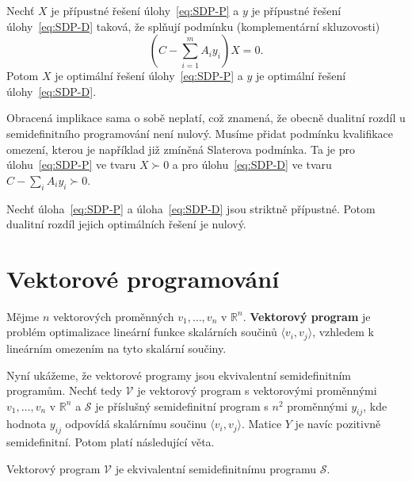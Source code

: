 \begin{vt2}
    Nechť $X$ je přípustné řešení úlohy~\ref{eq:SDP-P} a $y$ je přípustné řešení úlohy~\ref{eq:SDP-D} taková, že splňují podmínku (komplementární skluzovosti)
    $$
        \left( C - \sum_{i=1}^m A_i y_i \right) X = 0.
    $$
    Potom $X$ je optimální řešení úlohy~\ref{eq:SDP-P} a $y$ je optimální řešení úlohy~\ref{eq:SDP-D}.
\end{vt2}

Obracená implikace sama o sobě neplatí, což znamená, že obecně dualitní rozdíl u semidefinitního programování není nulový. Musíme přidat podmínku kvalifikace omezení, kterou je například již zmíněná Slaterova podmínka. Ta je pro úlohu~\ref{eq:SDP-P} ve tvaru $X \succ 0$ a pro úlohu~\ref{eq:SDP-D} ve tvaru $C - \sum_i A_i y_i \succ 0$.

\begin{vt2}
    Nechť úloha~\ref{eq:SDP-P} a úloha~\ref{eq:SDP-D} jsou striktně přípustné. Potom dualitní rozdíl jejich optimálních řešení je nulový.
\end{vt2}


\section{Vektorové programování}

Mějme $n$ vektorových proměnných $v_1, \dots, v_n$ v $\mathbb{R}^n$. \textbf{Vektorový program} je problém optimalizace lineární funkce skalárních součinů $\langle v_i, v_j \rangle$, vzhledem k lineárním omezením na tyto skalární součiny.

Nyní ukážeme, že vektorové programy jsou ekvivalentní semidefinitním programům. Nechť tedy $\mathcal{V}$ je vektorový program s vektorovými proměnnými $v_1, \dots, v_n$ v $\mathbb{R}^n$ a $\mathcal{S}$ je příslušný semidefinitní program s $n^2$ proměnnými $y_{ij}$, kde hodnota $y_{ij}$ odpovídá skalárnímu součinu $\langle v_i, v_j \rangle$. Matice $Y$ je navíc pozitivně semidefinitní. Potom platí následující věta.

\begin{vt2}\cite{approximation-algorithms}
    Vektorový program $\mathcal{V}$ je ekvivalentní semidefinitnímu programu $\mathcal{S}$.
\end{vt2}
